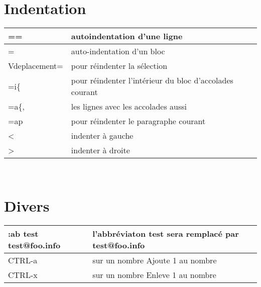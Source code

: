 \documentclass{article}
\begin{document}
\section{Indentation}
\begin{tabular}{|p{3cm}| l|  }
	\hline
	== & autoindentation d'une ligne\\ \hline
	= & auto-indentation d'un bloc\\ \hline
	V{deplacement}= & pour réindenter la sélection\\ \hline
	=i\{ & pour réindenter l'intérieur du bloc d'accolades courant\\ \hline
	=a\{, & les lignes avec les accolades aussi\\ \hline
	=ap & pour réindenter le paragraphe courant\\ \hline
	< & indenter à gauche\\ \hline
	> & indenter à droite\\ \hline
\end{tabular}\\

\section{Divers}
\begin{tabular}{|p{4cm}| l|  }
	\hline
	:ab test test@foo.info 	& l'abbréviaton test sera remplacé par test@foo.info \\ \hline
    CTRL-a &sur un nombre Ajoute 1 au nombre\\ \hline
    CTRL-x &sur un nombre Enleve 1 au nombre\\ \hline
\end{tabular}\\
\end{document}
